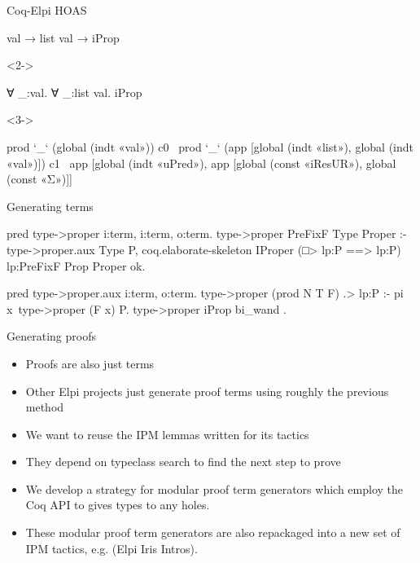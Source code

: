 \documentclass[aspectratio=169]{beamer}
\begin{document}
\begin{frame}[fragile]{Coq-Elpi HOAS}
    \begin{coqcode}
        val → list val → iProp
    \end{coqcode}%
    \begin{uncoverenv}<2->%
        \vspace*{-.8cm}
        \begin{coqcode}
            ∀ _:val. ∀ _:list val. iProp
        \end{coqcode}
    \end{uncoverenv}
    \begin{uncoverenv}<3->
        \vspace*{-.2cm}
        \begin{elpicode}
            prod `_` (global (indt «val»)) 
                 c0 \
                    prod `_` (app [global (indt «list»), 
                                   global (indt «val»)]) 
                         c1 \
                            app [global (indt «uPred»), 
                                app [global (const «iResUR»), 
                                global (const «Σ»)]]
        \end{elpicode}
    \end{uncoverenv}
\end{frame}

\begin{frame}[fragile]{Generating terms}
    \begin{elpicode}
        pred type->proper i:term, i:term, o:term.
        type->proper PreFixF Type Proper :-
            type->proper.aux Type P,
            coq.elaborate-skeleton 
                {{ IProper (□> lp:P ==> lp:P) lp:PreFixF }} 
                {{ Prop }} Proper ok.

        pred type->proper.aux i:term, o:term.
        type->proper (prod N T F) {{ .> lp:P }} :-
            pi x\ type->proper (F x) P.
        type->proper {{ iProp }} {{ bi_wand }}.
    \end{elpicode}
\end{frame}

\begin{frame}[fragile]{Generating proofs}
    \begin{itemize}[<+->]
        \item Proofs are also just terms %
        \item Other Elpi projects just generate proof terms using roughly the previous method
        \item We want to reuse the IPM lemmas written for its tactics
        \item They depend on typeclass search to find the next step to prove
        \item We develop a strategy for modular proof term generators which employ the Coq API to gives types to any holes.
        \item These modular proof term generators are also repackaged into a new set of IPM tactics, e.g.  (Elpi Iris Intros).
    \end{itemize}
\end{frame}
\end{document}
